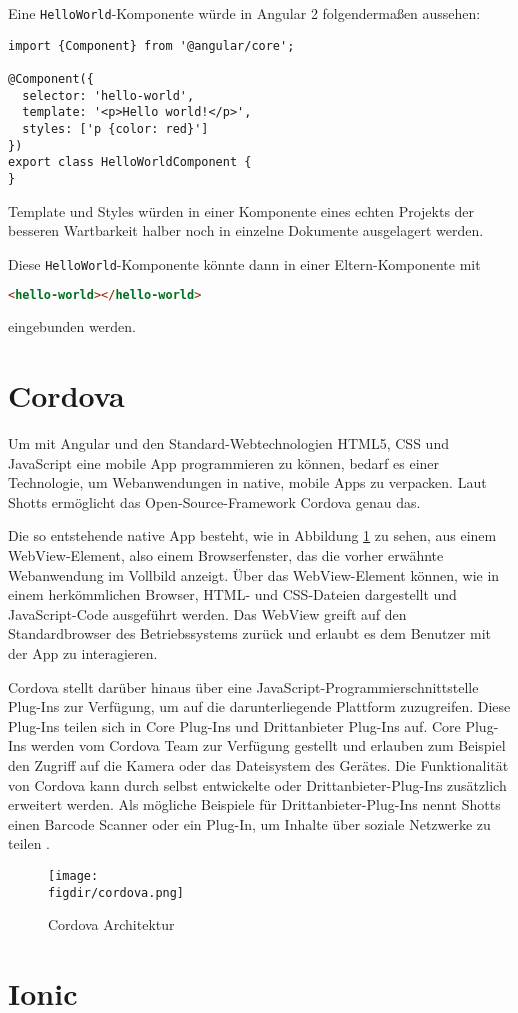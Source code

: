 Eine \texttt{HelloWorld}-Komponente würde in Angular 2 folgendermaßen aussehen:
\begin{codebox}
\begin{lstlisting}[style=typescript]
import {Component} from '@angular/core';

@Component({
  selector: 'hello-world',
  template: '<p>Hello world!</p>',
  styles: ['p {color: red}']
})
export class HelloWorldComponent {
}
\end{lstlisting}
\end{codebox}

Template und Styles würden in einer Komponente eines echten Projekts der besseren Wartbarkeit halber noch in einzelne Dokumente ausgelagert werden.

Diese \texttt{HelloWorld}-Komponente könnte dann in einer Eltern-Komponente mit
\begin{codebox}
\begin{lstlisting}[language=HTML]
<hello-world></hello-world>
\end{lstlisting}
\end{codebox}
eingebunden werden.

\section{Cordova}
Um mit Angular und den Standard-Webtechnologien HTML5, CSS und JavaScript eine mobile App programmieren zu können, bedarf es einer Technologie, um Webanwendungen in native, mobile Apps zu verpacken. Laut Shotts ermöglicht das Open-Source-Framework Cordova genau das. 

Die so entstehende native App besteht, wie in Abbildung \ref{fig:cordova} zu sehen, aus einem WebView-Element, also einem Browserfenster, das die vorher erwähnte Webanwendung im Vollbild anzeigt. Über das WebView-Element können, wie in einem herkömmlichen Browser, HTML- und CSS-Dateien dargestellt und JavaScript-Code ausgeführt werden. Das WebView greift auf den Standardbrowser des Betriebssystems zurück und erlaubt es dem Benutzer mit der App zu interagieren.

Cordova stellt darüber hinaus über eine JavaScript-Programmierschnittstelle Plug-Ins zur Verfügung, um auf die darunterliegende Plattform zuzugreifen. Diese Plug-Ins teilen sich in Core Plug-Ins und Drittanbieter Plug-Ins auf. Core Plug-Ins werden vom Cordova Team zur Verfügung gestellt und erlauben zum Beispiel den Zugriff auf die Kamera oder das Dateisystem des Gerätes. Die Funktionalität von Cordova kann durch selbst entwickelte oder Drittanbieter-Plug-Ins zusätzlich erweitert werden. Als mögliche Beispiele für Drittanbieter-Plug-Ins nennt Shotts einen Barcode Scanner oder ein Plug-In, um Inhalte über soziale Netzwerke zu teilen \cite{shotts:phonegap}.

\begin{figure}[htb]
\centering
\caption{Cordova Architektur}
\label{fig:cordova}
\texttt{[image: \\figdir/cordova.png]}
\end{figure}

\section{Ionic}












